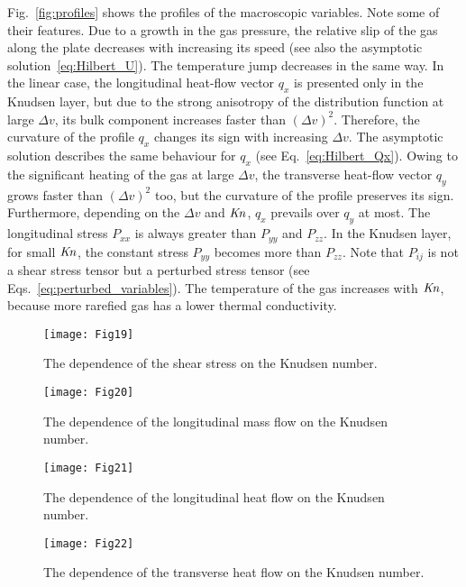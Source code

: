 \documentclass[review]{elsarticle}
\newcommand{\Kn}{\mbox{\textit{Kn}}}
\begin{document}
Fig.~\ref{fig:profiles} shows the profiles of the macroscopic variables.
Note some of their features.
Due to a growth in the gas pressure, the relative slip of the gas along the plate decreases
with increasing its speed (see also the asymptotic solution~\eqref{eq:Hilbert_U}).
The temperature jump decreases in the same way.
In the linear case, the longitudinal heat-flow vector \(q_x\) is presented only in the Knudsen layer,
but due to the strong anisotropy of the distribution function at large \(\Delta{v}\),
its bulk component increases faster than \((\Delta{v})^2\).
Therefore, the curvature of the profile \(q_x\) changes its sign with increasing \(\Delta{v}\).
The asymptotic solution describes the same behaviour for \(q_x\) (see Eq.~\eqref{eq:Hilbert_Qx}).
Owing to the significant heating of the gas at large \(\Delta{v}\),
the transverse heat-flow vector \(q_y\) grows faster than \((\Delta{v})^2\) too,
but the curvature of the profile preserves its sign.
Furthermore, depending on the \(\Delta{v}\) and \(\Kn\), \(q_x\) prevails over \(q_y\) at most.
The longitudinal stress \(P_{xx}\) is always greater than \(P_{yy}\) and \(P_{zz}\).
In the Knudsen layer, for small \(\Kn\), the constant stress \(P_{yy}\) becomes more than \(P_{zz}\).
Note that \(P_{ij}\) is not a shear stress tensor but a perturbed stress tensor
(see Eqs.~\eqref{eq:perturbed_variables}).
The temperature of the gas increases with \(\Kn\), because more rarefied gas
has a lower thermal conductivity.

\begin{figure}
    \centering
    \texttt{[image: Fig19]}
    \caption{The dependence of the shear stress on the Knudsen number.}
    \label{fig:shear}
\end{figure}

\begin{figure}
    \centering
    \texttt{[image: Fig20]}
    \caption{The dependence of the longitudinal mass flow on the Knudsen number.}
    \label{fig:flow}
\end{figure}

\begin{figure}
    \centering
    \texttt{[image: Fig21]}
    \caption{The dependence of the longitudinal heat flow on the Knudsen number.}
    \label{fig:qflow}
\end{figure}

\begin{figure}
    \centering
    \texttt{[image: Fig22]}
    \caption{The dependence of the transverse heat flow on the Knudsen number.}
    \label{fig:qflowy}
\end{figure}
\end{document}
